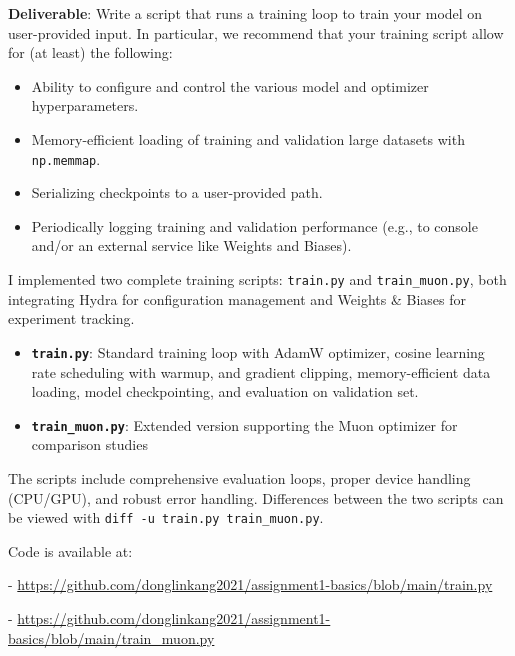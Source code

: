 
\textbf{Deliverable}: Write a script that runs a training loop to train your model on user-provided input. In particular, we recommend that your training script allow for (at least) the following:

\begin{itemize}
    \item Ability to configure and control the various model and optimizer hyperparameters.
    \item Memory-efficient loading of training and validation large datasets with \lstinline{np.memmap}.
    \item Serializing checkpoints to a user-provided path.
    \item Periodically logging training and validation performance (e.g., to console and/or an external service like Weights and Biases).
\end{itemize}

\begin{answer}
I implemented two complete training scripts: \lstinline{train.py} and \lstinline{train_muon.py}, both integrating Hydra for configuration management and Weights \& Biases for experiment tracking.

\begin{itemize}
    \item \textbf{\lstinline{train.py}}: Standard training loop with AdamW optimizer, cosine learning rate scheduling with warmup, and gradient clipping, memory-efficient data loading, model checkpointing, and evaluation on validation set.
    \item \textbf{\lstinline{train_muon.py}}: Extended version supporting the Muon optimizer for comparison studies
\end{itemize}

The scripts include comprehensive evaluation loops, proper device handling (CPU/GPU), and robust error handling. Differences between the two scripts can be viewed with \lstinline{diff -u train.py train_muon.py}.

Code is available at:

- \url{https://github.com/donglinkang2021/assignment1-basics/blob/main/train.py}

- \url{https://github.com/donglinkang2021/assignment1-basics/blob/main/train_muon.py}
\end{answer}
